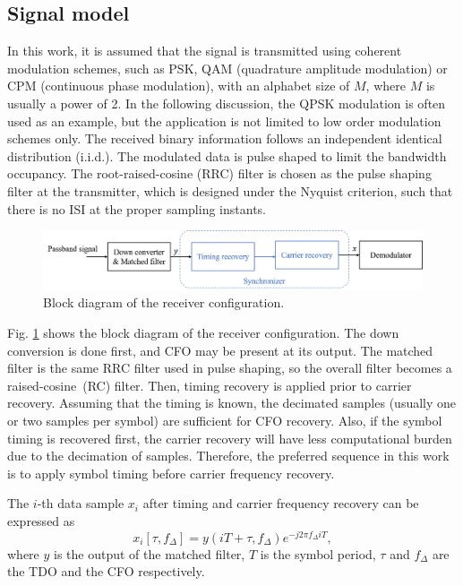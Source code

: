 \documentclass[journal,comsoc, onecolumn, 12pt,draftclsnofoot]{IEEEtran} %
\begin{document}
\subsection{Signal model }  


In this work, it is assumed that the signal is transmitted using coherent modulation schemes, such as PSK, QAM (quadrature amplitude modulation) or CPM (continuous phase modulation), with an alphabet size of \(M\), where \(M\) is usually a power of 2.
In the following discussion, the QPSK modulation is often used as an example, but the application is not limited to low order modulation schemes only.
The received binary information follows an independent identical distribution (i.i.d.).
The modulated data is pulse shaped to limit the bandwidth occupancy.
The root-raised-cosine (RRC) filter is chosen as the pulse shaping filter at the transmitter, which is designed under the Nyquist criterion, 
such that there is no ISI at the proper sampling instants.

\begin{figure}[ht]
\centering
\includegraphics[width=5.5 in]{pic/sys_conf.png}
\caption{Block diagram of the receiver configuration.}
\label{fig:sysconf} 
\end{figure}

Fig. \ref{fig:sysconf} shows the block diagram of the receiver configuration.
The down conversion is done first, and CFO may be present at its output.
The matched filter is the same RRC filter used in pulse shaping, so the overall filter becomes a raised-cosine~(RC) filter. 
Then, timing recovery is applied prior to carrier recovery.
Assuming that the timing is known, the decimated samples (usually one or two samples per symbol) are sufficient for CFO recovery.
Also, if the symbol timing is recovered first, the carrier recovery will have less computational burden due to the decimation of samples.
Therefore, the preferred sequence in this work is to apply symbol timing before carrier frequency recovery.

The $i$-th data sample \(x_i\) after timing and carrier frequency recovery can be expressed as \cite{Xie2012ExactOFDM}
\begin{equation}
{x_i}[\tau, f_\Delta ] = y(iT +  \tau, f_\Delta){e^{ - j2\pi {f_\Delta }iT}},
\end{equation}
% 
% 
where \(y\) is the output of the matched filter, \(T\) is the symbol period, \(\tau\) and \(f_\Delta\) are the TDO and the CFO respectively.
\end{document}
